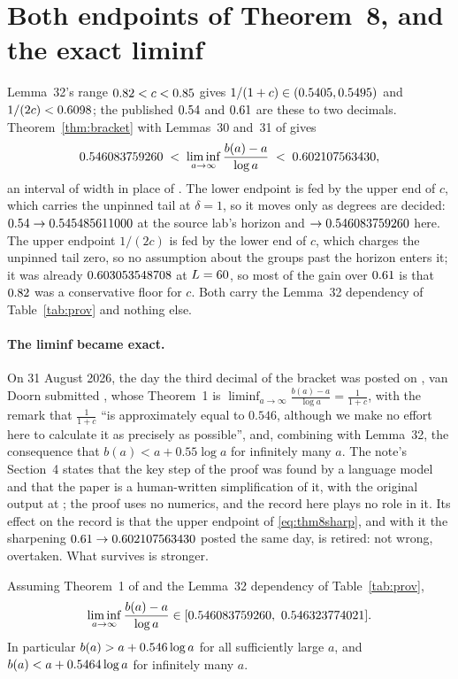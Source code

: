 \documentclass[11pt]{article}
\newcommand{\lia}{\liminf_{a\to\infty}\frac{b(a)-a}{\log a}}
\begin{document}
\section{Both endpoints of Theorem~8, and the exact liminf}\label{sec:thm8}

Lemma~32's range $0.82<c<0.85$ gives $1/(1+c)\in(0.5405,0.5495)$ and $1/(2c)<0.6098$; the published $0.54$ and $0.61$ are these to two decimals. Theorem~\ref{thm:bracket} with Lemmas~30 and~31 of \cite{vD24} gives
\begin{equation}\label{eq:thm8sharp}
\InvLo\;<\;\lia\;<\;\TwoCHi ,
\end{equation}
an interval of width \NewWidth{} in place of \VDWidth. The lower endpoint is fed by the upper end of $c$, which carries the unpinned tail at $\delta=1$, so it moves only as degrees are decided: $0.54\to0.545485611000$ at the source lab's horizon and $\to0.546083759260$ here. The upper endpoint $1/(2c)$ is fed by the lower end of $c$, which charges the unpinned tail zero, so no assumption about the groups past the horizon enters it; it was already $0.603053548708$ at $L=60$, so most of the gain over $0.61$ is that $0.82$ was a conservative floor for $c$. Both carry the Lemma~32 dependency of Table~\ref{tab:prov} and nothing else.

\paragraph{The liminf became exact.} On 31 August 2026, the day the third decimal of the bracket was posted on \cite{Issue164}, van Doorn submitted \cite{vD26}, whose Theorem~1 is $\lia=\frac1{1+c}$, with the remark that $\frac1{1+c}$ ``is approximately equal to $0.546$, although we make no effort here to calculate it as precisely as possible'', and, combining with Lemma~32, the consequence that $b(a)<a+0.55\log a$ for infinitely many $a$. The note's Section~4 states that the key step of the proof was found by a language model and that the paper is a human-written simplification of it, with the original output at \cite{GPTnote}; the proof uses no numerics, and the record here plays no role in it. Its effect on the record is that the upper endpoint of \eqref{eq:thm8sharp}, and with it the sharpening $0.61\to0.602107563430$ posted the same day, is retired: not wrong, overtaken. What survives is stronger.

\begin{corollary}\label{cor:liminf}
Assuming Theorem~1 of \cite{vD26} and the Lemma~32 dependency of Table~\ref{tab:prov},
\[
\lia\in[\InvLo,\ \InvHi] .
\]
In particular $b(a)>a+0.546\log a$ for all sufficiently large $a$, and $b(a)<a+0.5464\log a$ for infinitely many $a$.
\end{corollary}
\end{document}
